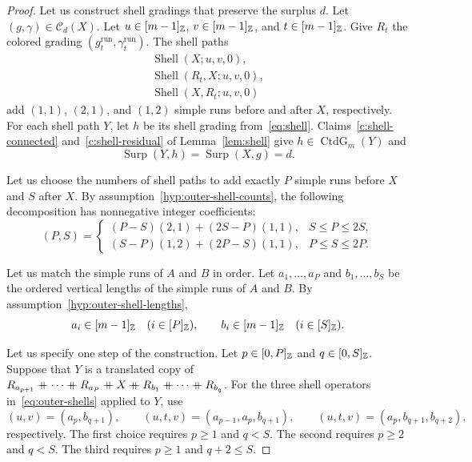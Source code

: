 \begin{proof}
Let us construct shell gradings that preserve the surplus $d$.
Let $(g,\gamma)\in\mathcal C_d(X)$. Let $u\in[m-1]_{\mathbb Z}$, $v\in[m-1]_{\mathbb Z}$, and $t\in[m-1]_{\mathbb Z}$.
Give $R_t$ the colored grading $(g_t^{\mathrm{run}},\gamma_t^{\mathrm{run}})$.
The shell paths
\begin{equation}\label{eq:outer-shells}
\begin{gathered}
 \operatorname{Shell}(X;u,v,0),\\
 \operatorname{Shell}(R_t,X;u,v,0),\\
 \operatorname{Shell}(X,R_t;u,v,0)
\end{gathered}
\end{equation}
add $(1,1)$, $(2,1)$, and $(1,2)$ simple runs before and after $X$, respectively.
For each shell path $Y$, let $h$ be its shell grading from~\eqref{eq:shell}.
Claims~\ref{c:shell-connected} and~\ref{c:shell-residual} of Lemma~\ref{lem:shell} give $h\in\operatorname{CtdG}_m(Y)$ and
\[
 \operatorname{Surp}(Y,h)=\operatorname{Surp}(X,g)=d.
\]

Let us choose the numbers of shell paths to add exactly $P$ simple runs before $X$ and $S$ after $X$.
By assumption~\ref{hyp:outer-shell-counts}, the following decomposition has nonnegative integer coefficients:
\begin{equation}\label{eq:outer-shell-counts}
 (P,S)=
 \begin{cases}
 (P-S)(2,1)+(2S-P)(1,1),& S\le P\le2S,\\
 (S-P)(1,2)+(2P-S)(1,1),& P\le S\le2P.
 \end{cases}
\end{equation}

Let us match the simple runs of $A$ and $B$ in order.
Let $a_1,\ldots,a_P$ and $b_1,\ldots,b_S$ be the ordered vertical lengths
of the simple runs of $A$ and $B$.
By assumption~\ref{hyp:outer-shell-lengths},
\[
 a_i\in[m-1]_{\mathbb Z}\quad(i\in[P]_{\mathbb Z}),\qquad
 b_i\in[m-1]_{\mathbb Z}\quad(i\in[S]_{\mathbb Z}).
\]

Let us specify one step of the construction.
Let $p\in[0,P]_{\mathbb Z}$ and $q\in[0,S]_{\mathbb Z}$.
Suppose that $Y$ is a translated copy of
$R_{a_{p+1}}\ccn \cdots\ccn R_{a_P}\ccn X\ccn R_{b_1}\ccn \cdots\ccn R_{b_q}$.
For the three shell operators in~\eqref{eq:outer-shells} applied to $Y$, use
\[
 (u,v)=(a_p,b_{q+1}),\qquad
 (u,t,v)=(a_{p-1},a_p,b_{q+1}),\qquad
 (u,t,v)=(a_p,b_{q+1},b_{q+2}),
\]
respectively.
The first choice requires $p\ge1$ and $q<S$.
The second requires $p\ge2$ and $q<S$.
The third requires $p\ge1$ and $q+2\le S$.


\end{proof}
